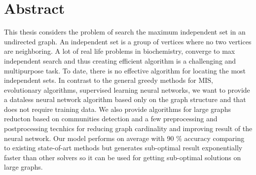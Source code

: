 \thispagestyle{plain}			%
\setlength{\parskip}{0pt plus 1.0pt}
\section*{Abstract}

This thesis considers the problem of search the maximum independent set in an undirected graph. An independent set is a group of vertices where no two vertices are neighboring. A lot of real life problems in biochemistry,  converge to max independent search and thus creating efficient algorithm is a challenging and multipurpose task. To date, there is no effective algorithm for locating the most independent sets. In contrast to the general greedy methods for MIS, evolutionary algorithms, supervised learning neural networks, we want to provide a dataless neural network algorithm based only on the graph structure and that does not require training data. We also provide algorithms for large graphs reducton based on communities detection and a few preprocessing and postprocessing tecnhics for reducing graph cardinality and improving result of the neural network. Our model performs on average with 90 \% accuracy comparing to existing state-of-art methods but generates sub-optimal result exponentially faster than other solvers so it can be used for getting sub-optimal solutions on large graphs.

\vfill

\thispagestyle{empty}
\mbox{}
